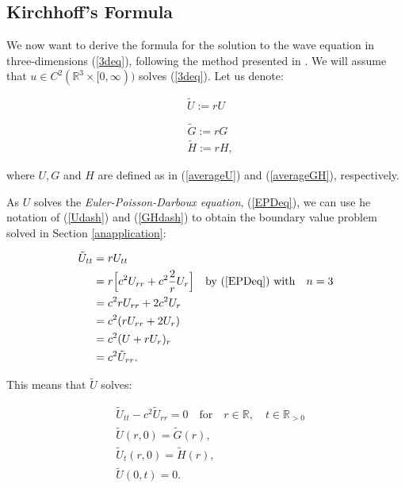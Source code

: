 \documentclass[a4paper, 12pt]{article}
\numberwithin{equation}{section}
\begin{document}
\subsection{Kirchhoff's Formula}
We now want to derive the formula for the solution to the wave equation in
three-dimensions (\ref{3deq}), following the method presented in \cite[Ch. 2.4.1.c]{Ev}. We will assume that $u \in C^2(\mathbb{R}^3
\times [0, \infty))$ solves (\ref{3deq}). Let us denote:

\begin{equation} \label{Udash}
    \tilde{U}:=rU
\end{equation}

\begin{equation} \label{GHdash}
    \begin{aligned}
        &\tilde{G}:=rG\\
        &\tilde{H}:=rH,    
    \end{aligned}
\end{equation}

where $U,G$ and $H$ are defined as in (\ref{averageU}) and (\ref{averageGH}),
respectively. 

As $U$ solves the \emph{Euler-Poisson-Darboux equation}, (\ref{EPDeq}), we can
use he notation of (\ref{Udash}) and (\ref{GHdash}) to obtain the boundary value
problem solved in Section \ref{anapplication}:

\begin{equation*}
    \begin{aligned}
        \tilde{U}_{tt}&=rU_{tt}\\
        &=r\Big[c^2U_{rr}+c^2\frac{2}{r}U_r\Big] \quad \textrm{by (\ref{EPDeq}) with} \quad n=3\\
        &=c^2rU_{rr}+2c^2U_r\\
        &=c^2(rU_{rr}+2U_r)\\
        &=c^2(U+rU_r)_r\\
        &=c^2\tilde{U}_{rr}.        
    \end{aligned}
\end{equation*}

This means that $\tilde{U}$ solves:

\begin{equation} \label{tilUwave}
    \begin{aligned}
        &\tilde{U}_{tt}-c^2\tilde{U}_{rr}=0 \quad \textrm {for} \quad r \in \mathbb{R}, \quad t \in \mathbb{R}_{>0}\\
        &\tilde{U}(r, 0)=\tilde{G}(r), \\
        &\tilde{U}_t(r, 0)=\tilde{H}(r),\\
        &\tilde{U}(0, t)=0.
    \end{aligned}
\end{equation}
\end{document}
